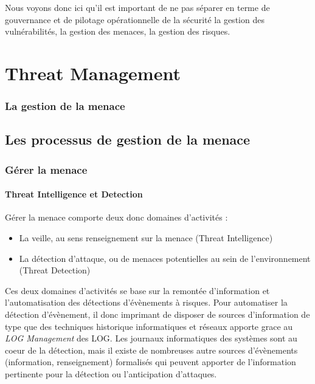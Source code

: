 Nous voyons donc ici qu'il est important de ne pas séparer en terme de gouvernance et de pilotage opérationnelle de la sécurité la gestion des vulnérabilités, la gestion des menaces, la gestion des risques.


\section{Threat Management}

\begin{frame}
\frametitle<presentation>{La gestion de la menace}

\end{frame}



\subsection{Les processus de gestion de la menace}

\begin{frame}
\frametitle<presentation>{Gérer la menace}
\framesubtitle<presentation>{Threat Intelligence et Detection}
Gérer la menace comporte deux donc domaines d'activités :
\begin{itemize}
  \item La veille, au sens renseignement sur la menace (Threat Intelligence)
  \item La détection d'attaque, ou de menaces potentielles au sein de l'environnement (Threat Detection)
\end{itemize}
\end{frame}

Ces deux domaines d'activités se base sur la remontée d'information et l'automatisation des détections d'évènements à risques.  Pour automatiser la détection d'évènement, il donc imprimant de disposer de sources d'information de type  que des techniques historique informatiques et réseaux  apporte grace au \textit{LOG  Management} des LOG. Les journaux informatiques des systèmes sont au coeur de la détection, mais il existe de nombreuses autre sources d'évènements (information, renseignement) formalisés qui peuvent apporter de l'information pertinente pour la détection ou l'anticipation d'attaques.

